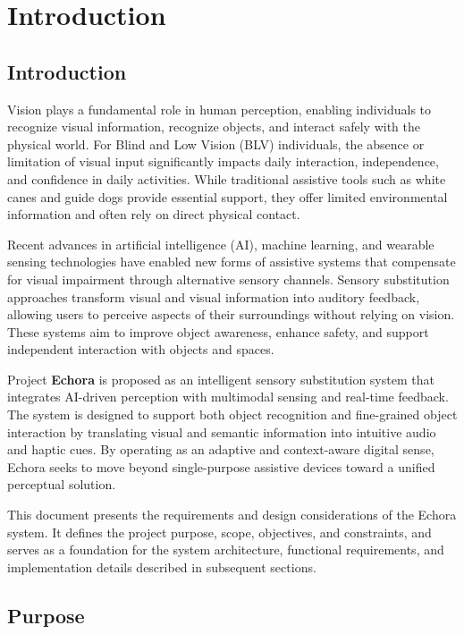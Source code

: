 \chapter{Introduction}
\label{ch:intro}

\section{Introduction}

Vision plays a fundamental role in human perception, enabling individuals to recognize visual information, recognize objects, and interact safely with the physical world. For Blind and Low Vision (BLV) individuals, the absence or limitation of visual input significantly impacts daily interaction, independence, and confidence in daily activities. While traditional assistive tools such as white canes and guide dogs provide essential support, they offer limited environmental information and often rely on direct physical contact.

Recent advances in artificial intelligence (AI), machine learning, and wearable sensing technologies have enabled new forms of assistive systems that compensate for visual impairment through alternative sensory channels. Sensory substitution approaches transform visual and visual information into auditory feedback, allowing users to perceive aspects of their surroundings without relying on vision. These systems aim to improve object awareness, enhance safety, and support independent interaction with objects and spaces.

Project \textbf{Echora} is proposed as an intelligent sensory substitution system that integrates AI-driven perception with multimodal sensing and real-time feedback. The system is designed to support both object recognition and fine-grained object interaction by translating visual and semantic information into intuitive audio and haptic cues. By operating as an adaptive and context-aware digital sense, Echora seeks to move beyond single-purpose assistive devices toward a unified perceptual solution.

This document presents the requirements and design considerations of the Echora system. It defines the project purpose, scope, objectives, and constraints, and serves as a foundation for the system architecture, functional requirements, and implementation details described in subsequent sections.

\section{Purpose}

